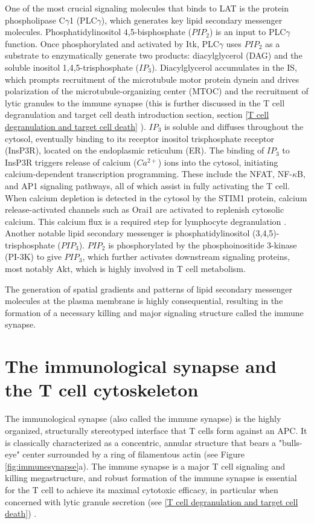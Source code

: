 One of the most crucial signaling molecules that binds to LAT is the protein phospholipase C$\gamma$1 (PLC$\gamma$), which generates key lipid secondary messenger molecules. Phosphatidylinositol 4,5-bisphosphate ($PIP_{2}$) is an input to PLC$\gamma$ function. Once phosphorylated and activated by Itk, PLC$\gamma$ uses $PIP_{2}$ as a substrate to enzymatically generate two products: diacylglycerol (DAG) and the soluble inositol 1,4,5-trisphosphate ($IP_{3}$). Diacylglycerol accumulates in the IS, which prompts recruitment of the microtubule motor protein dynein and drives polarization of the microtubule-organizing center (MTOC) \cite{Quann2009} and the recruitment of lytic granules to the immune synapse (this is further discussed in the T cell degranulation and target cell death introduction section, section \ref{T cell degranulation and target cell death} \cite{Stinchcombe2006}). $IP_{3}$ is soluble and diffuses throughout the cytosol, eventually binding to its receptor inositol trisphosphate receptor (InsP3R), located on the endoplasmic reticulum (ER). The binding of $IP_{3}$ to InsP3R triggers release of calcium ($Ca^{2+}$) ions into the cytosol, initiating calcium-dependent transcription programming. These include the NFAT, NF-$\kappa$B, and AP1 signaling pathways, all of which assist in fully activating the T cell. When calcium depletion is detected in the cytosol by the STIM1 protein, calcium release-activated channels such as Orai1 are activated to replenish cytosolic calcium. This calcium flux is a required step for lymphocyte degranulation \cite{Maul-Pavicic2011}. Another notable lipid secondary messenger is phosphatidylinositol (3,4,5)-trisphosphate ($PIP_{3}$). $PIP_{2}$ is phosphorylated by the phosphoinositide 3-kinase (PI-3K) to give $PIP_{3}$, which further activates downstream signaling proteins, most notably Akt, which is highly involved in T cell metabolism.

The generation of spatial gradients and patterns of lipid secondary messenger molecules at the plasma membrane is highly consequential, resulting in the formation of a necessary killing and major signaling structure called the immune synapse. 

\section{The immunological synapse and the T cell cytoskeleton}
\label{The immunological synapse and the T cell cytoskeleton}
The immunological synapse (also called the immune synapse) is the highly organized, structurally stereotyped interface that T cells form against an APC. It is classically characterized as a concentric, annular structure that bears a "bulls-eye" center surrounded by a ring of filamentous actin (see Figure \ref{fig:immunesynapse}a). The immune synapse is a major T cell signaling and killing megastructure, and robust formation of the immune synapse is essential for the T cell to achieve its maximal cytotoxic efficacy, in particular when concerned with lytic granule secretion (see \ref{T cell degranulation and target cell death}) \cite{Ritter2015}.

